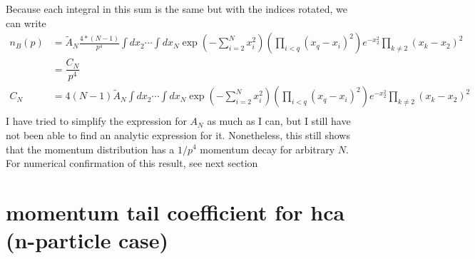 \documentclass[onecolumn,english,aps,pra]{revtex4}
\begin{document}
Because each integral in this sum is the same but with the indices rotated, we can write
\begin{align*}
n_{B}(p) & = \tilde{A}_{N} \frac{4 * (N - 1)}{p^4} \int dx_{2} \cdots \int dx_{N} 
	\exp\left(- \sum_{i = 2}^{N} x_{i}^2\right) \left( \prod_{ i < q} (x_{q} - x_{i})^2 \right) 
	e^{-x_{2}^2} \prod_{k \neq 2} (x_{k} - x_{2})^2\\
	& = \dfrac{C_{N}}{p^4}\\
C_{N} & = 4(N - 1)\tilde{A}_{N}  \int dx_{2} \cdots \int dx_{N} 
	\exp\left(- \sum_{i = 2}^{N} x_{i}^2\right) \left( \prod_{ i < q} (x_{q} - x_{i})^2 \right) 
	e^{-x_{2}^2} \prod_{k \neq 2} (x_{k} - x_{2})^2\\
\end{align*}
I have tried to simplify the expression for $A_{N}$ as much as I can, but I still have not been able to find an analytic expression for it. Nonetheless, this still shows that the momentum distribution has a $1/p^4$ momentum decay for arbitrary $N$. For numerical confirmation of this result, see next section

\section{momentum tail coefficient for hca (n-particle case)}
\end{document}
